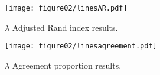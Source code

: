 \documentclass[10pt, a4paper]{article}
\begin{document}

\begin{figure}[!h]
\centering
\texttt{[image: figure02/linesAR.pdf]}
\caption{$\lambda$ Adjusted Rand index results.}
\label{fig:mua}
\end{figure}

\begin{figure}[!h]
\centering
\texttt{[image: figure02/linesagreement.pdf]}
\caption{$\lambda$ Agreement proportion results.}
\label{fig:mub}
\end{figure}



{}
\end{document}
